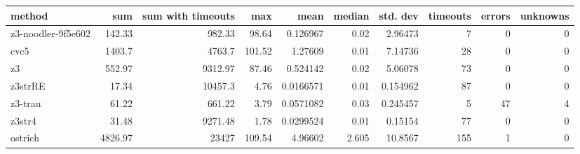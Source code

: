 \begin{tabular}{lrrrrrrrrr}
\hline
 method             &     sum &   sum with timeouts &    max &      mean &   median &   std. dev &   timeouts &   errors &   unknowns \\
\hline
 z3-noodler-9f5e602 &  142.33 &              982.33 &  98.64 & 0.126967  &    0.02  &   2.96473  &          7 &        0 &          0 \\
 cvc5               & 1403.7  &             4763.7  & 101.52 & 1.27609   &    0.01  &   7.14736  &         28 &        0 &          0 \\
 z3                 &  552.97 &             9312.97 &  87.46 & 0.524142  &    0.02  &   5.06078  &         73 &        0 &          0 \\
 z3strRE            &   17.34 &            10457.3  &   4.76 & 0.0166571 &    0.01  &   0.154962 &         87 &        0 &          0 \\
 z3-trau            &   61.22 &              661.22 &   3.79 & 0.0571082 &    0.03  &   0.245457 &          5 &       47 &          4 \\
 z3str4             &   31.48 &             9271.48 &   1.78 & 0.0299524 &    0.01  &   0.15154  &         77 &        0 &          0 \\
 ostrich            & 4826.97 &            23427    & 109.54 & 4.96602   &    2.605 &  10.8567   &        155 &        1 &          0 \\
\hline
\end{tabular}
